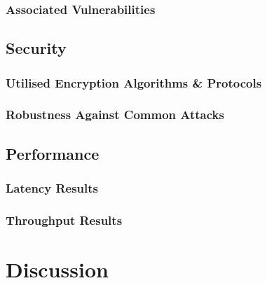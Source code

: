 \documentclass[12pt,conference]{IEEEtran}
\begin{document}
\subsubsection{Associated Vulnerabilities}
\subsection{Security}
\subsubsection{Utilised Encryption Algorithms \& Protocols}
\subsubsection{Robustness Against Common Attacks}
\subsection{Performance}
\subsubsection{Latency Results}
\subsubsection{Throughput Results}
\section{Discussion}



\end{document}
